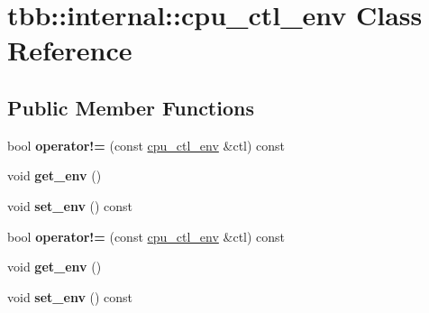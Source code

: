 \hypertarget{classtbb_1_1internal_1_1cpu__ctl__env}{}\section{tbb\+:\+:internal\+:\+:cpu\+\_\+ctl\+\_\+env Class Reference}
\label{classtbb_1_1internal_1_1cpu__ctl__env}
\subsection*{Public Member Functions}
\begin{DoxyCompactItemize}
\item 
\hypertarget{classtbb_1_1internal_1_1cpu__ctl__env_a70d08fbeb98044a1e8eda8fbc9241a46}{}bool {\bfseries operator!=} (const \hyperlink{classtbb_1_1internal_1_1cpu__ctl__env}{cpu\+\_\+ctl\+\_\+env} \&ctl) const \label{classtbb_1_1internal_1_1cpu__ctl__env_a70d08fbeb98044a1e8eda8fbc9241a46}

\item 
\hypertarget{classtbb_1_1internal_1_1cpu__ctl__env_aaa8736f85328446abb0d9b75a031a12d}{}void {\bfseries get\+\_\+env} ()\label{classtbb_1_1internal_1_1cpu__ctl__env_aaa8736f85328446abb0d9b75a031a12d}

\item 
\hypertarget{classtbb_1_1internal_1_1cpu__ctl__env_a9d4dfd8cbbd56ce66effae5af7dbc418}{}void {\bfseries set\+\_\+env} () const \label{classtbb_1_1internal_1_1cpu__ctl__env_a9d4dfd8cbbd56ce66effae5af7dbc418}

\item 
\hypertarget{classtbb_1_1internal_1_1cpu__ctl__env_a70d08fbeb98044a1e8eda8fbc9241a46}{}bool {\bfseries operator!=} (const \hyperlink{classtbb_1_1internal_1_1cpu__ctl__env}{cpu\+\_\+ctl\+\_\+env} \&ctl) const \label{classtbb_1_1internal_1_1cpu__ctl__env_a70d08fbeb98044a1e8eda8fbc9241a46}

\item 
\hypertarget{classtbb_1_1internal_1_1cpu__ctl__env_aaa8736f85328446abb0d9b75a031a12d}{}void {\bfseries get\+\_\+env} ()\label{classtbb_1_1internal_1_1cpu__ctl__env_aaa8736f85328446abb0d9b75a031a12d}

\item 
\hypertarget{classtbb_1_1internal_1_1cpu__ctl__env_a9d4dfd8cbbd56ce66effae5af7dbc418}{}void {\bfseries set\+\_\+env} () const \label{classtbb_1_1internal_1_1cpu__ctl__env_a9d4dfd8cbbd56ce66effae5af7dbc418}


\end{DoxyCompactItemize}
